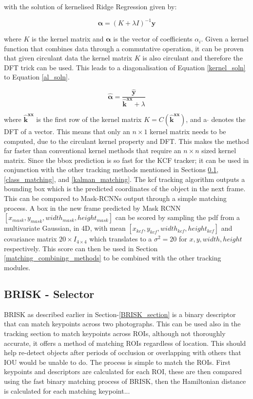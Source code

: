 \documentclass[a4paper,11pt,notitlepage]{article}
\begin{document}
with the solution of kernelised Ridge Regression given by:

\begin{equation}
\mathbf{\alpha} = (K + \lambda I)^{-1} \mathbf{y}
\label{kernel_soln}
\end{equation}

where $K$ is the kernel matrix and $\mathbf{\alpha}$ is the vector of coefficients $\alpha_{i}$. Given a kernel function that combines data through a commutative operation, it can be proven that given circulant data the kernel matrix $K$ is also circulant and therefore the DFT trick can be used. This leads to a diagonalisation of Equation \ref{kernel_soln} to Equation \ref{al_soln}.

\begin{equation}
\mathbf{\hat{\alpha}} = \frac{\mathbf{\hat{y}}}{\mathbf{\hat{k}}^{\mathbf{xx}} + \lambda}
\label{al_soln}
\end{equation}

where $\mathbf{\hat{k}}^{\mathbf{xx}}$ is the first row of the kernel matrix $K = C(\mathbf{\hat{k}}^{\mathbf{xx}})$, and a $\hat{ }$ denotes the DFT of a vector. This means that only an $n \times 1$ kernel matrix needs to be computed, due to the circulant kernel property and DFT. This makes the method far faster than conventional kernel methods that require an $n \times n$ sized kernel matrix. Since the bbox prediction is so fast for the KCF tracker; it can be used in conjunction with the other tracking methods mentioned in Sections \ref{BRISK_matching}, \ref{class_matching}, and \ref{kalman_matching}.
\newline
\newline
The kcf tracking algorithm outputs a bounding box which is the predicted coordinates of the object in the next frame. This can be compared to Mask-RCNNs output through a simple matching process. A box in the new frame predicted by Mask RCNN $[x_{mask},y_{mask},width_{mask},height_{mask}]$ can be scored by sampling the pdf from a multivariate Gaussian, in 4D, with mean $[x_{kcf},y_{kcf},width_{kcf},height_{kcf}]$ and covariance matrix $20 \times I_{4 \times 4}$ which translates to a $\sigma^{2} = 20$ for $x,y,width,height$ respectively. This score can then be used in Section \ref{matching_combining_methods} to be combined with the other tracking modules.


\subsection{BRISK - Selector} \label{BRISK_matching}
BRISK as described earlier in Section-\ref{BRISK_section} is a binary descriptor that can match keypoints across two photographs. This can be used also in the tracking section to match keypoints across ROIs, although not thoroughly accurate, it offers a method of matching ROIs regardless of location. This should help re-detect objects after periods of occlusion or overlapping with others that IOU would be unable to do. The process is simple to match the ROIs. First keypoints and descriptors are calculated for each ROI, these are then compared using the fast binary matching process of BRISK, then the Hamiltonian distance is calculated for each matching keypoint...
\end{document}
